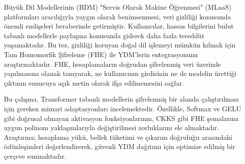 \begin{ozetenv}
    Büyük Dil Modellerinin (BDM) "Servis Olarak Makine Öğrenmesi" (MLaaS) platformları aracılığıyla yaygın olarak benimsenmesi, veri gizliliği konusunda önemli endişeleri beraberinde getirmiştir. Kullanıcılar, hassas bilgilerini bulut tabanlı modellerle paylaşma konusunda giderek daha fazla tereddüt yaşamaktadır. Bu tez, gizliliği koruyan doğal dil işlemeyi mümkün kılmak için Tam Homomorfik Şifreleme (FHE) ile YDM'lerin entegrasyonunu araştırmaktadır. FHE, hesaplamaların doğrudan şifrelenmiş veri üzerinde yapılmasına olanak tanıyarak, ne kullanıcının girdisinin ne de modelin ürettiği çıktının sunucuya açık metin olarak ifşa edilmemesini sağlar.
    
    Bu çalışma, Transformer tabanlı modellerin şifrelenmiş bir alanda çalıştırılması için gereken mimari adaptasyonları incelemektedir. Özellikle, Softmax ve GELU gibi doğrusal olmayan aktivasyon fonksiyonlarının, CKKS gibi FHE şemalarına uygun polinom yaklaşımlarıyla değiştirilmesi zorluklarını ele almaktadır. Araştırma; hesaplama yükü, bellek tüketimi ve çıkarım doğruluğu arasındaki ödünleşimleri değerlendirerek, güvenli YDM dağıtımı için optimize edilmiş bir çerçeve sunmaktadır.
\end{ozetenv}